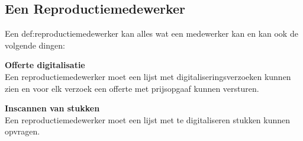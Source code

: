 \documentclass[a4paper,titlepage]{report}
\makeatletter
\def\nameddisplayedlabel#1#2{
  \label{#1}
  \begingroup
   \def\@currentlabel{#2}%
   \label{#1:name}\endgroup
   \textbf{#2}\hfill\\
}
\makeatother
\begin{document}
    \subsection{Een Reproductiemedewerker}
      Een \gls{def:reproductiemedewerker} kan alles wat een medewerker kan en kan ook de
      volgende dingen:
      \begin{enumerate}[label={[F:\arabic*]},resume]
        \item\nameddisplayedlabel{f:offerte}{Offerte digitalisatie}
          Een reproductiemedewerker moet een lijst met digitaliseringsverzoeken
          kunnen zien en voor elk verzoek een offerte met prijsopgaaf kunnen
          versturen.
        \item\nameddisplayedlabel{f:inscannen}{Inscannen van stukken}
          Een reproductiemedewerker moet een lijst met te digitaliseren stukken
          kunnen opvragen.
      \end{enumerate}
\end{document}
